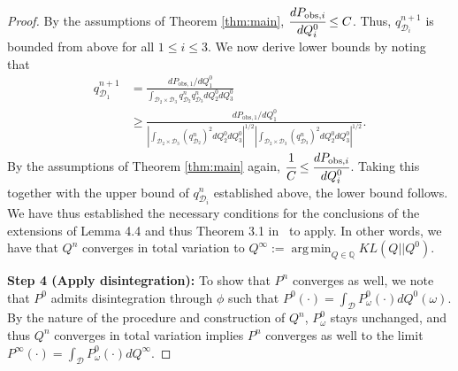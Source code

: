 \documentclass{article}
\newcommand{\q}{\mathbb{Q}}
\DeclareMathOperator*{\argmin}{arg\,min}
\begin{document}
\begin{proof}
By the assumptions of Theorem \ref{thm:main}, $\cfrac{dP_{\text{obs},i}}{dQ^0_i} \le C$. 
Thus, $q^{n+1}_{\mathcal{D}_{i}}$ is bounded from above for all $1 \le i \le 3$.
We now derive lower bounds by noting that
\begin{align*}
    q^{n+1}_{\mathcal{D}_{1}} &= \frac{dP_{\text{obs},1}/dQ_{1}^{0}}{\int_{\mathcal{D}_{2} \times \mathcal{D}_{3}}q^{n}_{\mathcal{D}_{2}}q^{n}_{\mathcal{D}_{3}} dQ^{0}_{2}dQ^{0}_{3}}\\
        &\ge \frac{dP_{\text{obs},1}/dQ_{1}^{0}}{|\int_{\mathcal{D}_{2} \times \mathcal{D}_{3}}(q^{n}_{\mathcal{D}_{2}})^{2}dQ^{0}_{2}dQ^{0}_{3}|^{1/2} |\int_{\mathcal{D}_{2} \times \mathcal{D}_{3}}(q^{n}_{\mathcal{D}_{3}})^{2}dQ^{0}_{2}dQ^{0}_{3}|^{1/2}}. %
\end{align*} 
By the assumptions of Theorem \ref{thm:main} again, $\cfrac{1}{C} \le \cfrac{dP_{\text{obs},i}}{dQ^0_i}$. 
Taking this together with the upper bound of $q^{n}_{\mathcal{D}_{i}}$ established above, the lower bound follows. 
We have thus established the necessary conditions for the conclusions of the extensions of Lemma 4.4 and thus Theorem 3.1 in~\cite{Ruschendorf1995} to apply.
In other words, we have that $Q^{n}$ converges in total variation to $Q^{\infty} := \argmin_{Q \in \q}KL(Q || Q^0)$.

{\bf Step 4 (Apply disintegration):} 
To show that $P^{n}$ converges as well, we note that $P^0$ admits disintegration through $\phi$ such that $P^0(\cdot) = \int_\mathcal{D} P^0_{\omega}(\cdot) dQ^0(\omega)$. 
By the nature of the procedure and construction of $Q^n$, $P^0_{\omega}$ stays unchanged, and thus $Q^n$ converges in total variation implies $P^n$ converges as well to the limit $P^\infty(\cdot)=\int_\mathcal{D} P^0_{\omega}(\cdot) dQ^\infty$.
\end{proof}
\end{document}

